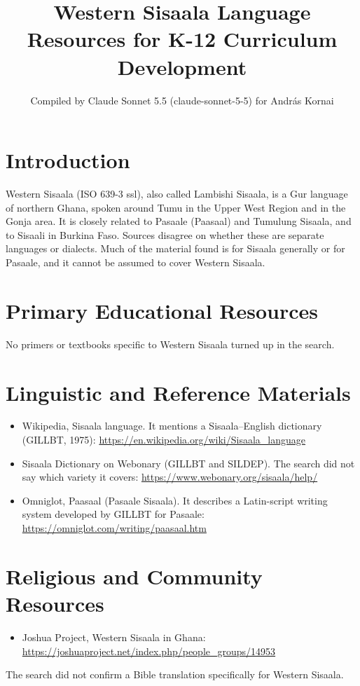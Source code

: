 \documentclass[12pt]{article}
\title{Western Sisaala Language Resources for K-12 Curriculum Development}
\author{Compiled by Claude Sonnet 5.5 (claude-sonnet-5-5) for Andr\'as Kornai}
\date{}
\begin{document}
\maketitle

\section{Introduction}
Western Sisaala (ISO 639-3 ssl), also called Lambishi Sisaala, is a Gur language of northern Ghana, spoken around Tumu in the Upper West Region and in the Gonja area. It is closely related to Pasaale (Paasaal) and Tumulung Sisaala, and to Sisaali in Burkina Faso. Sources disagree on whether these are separate languages or dialects. Much of the material found is for Sisaala generally or for Pasaale, and it cannot be assumed to cover Western Sisaala.

\section{Primary Educational Resources}
No primers or textbooks specific to Western Sisaala turned up in the search.

\section{Linguistic and Reference Materials}
\begin{itemize}
\item Wikipedia, Sisaala language. It mentions a Sisaala--English dictionary (GILLBT, 1975): \url{https://en.wikipedia.org/wiki/Sisaala_language}
\item Sisaala Dictionary on Webonary (GILLBT and SILDEP). The search did not say which variety it covers: \url{https://www.webonary.org/sisaala/help/}
\item Omniglot, Paasaal (Pasaale Sisaala). It describes a Latin-script writing system developed by GILLBT for Pasaale: \url{https://omniglot.com/writing/paasaal.htm}
\end{itemize}

\section{Religious and Community Resources}
\begin{itemize}
\item Joshua Project, Western Sisaala in Ghana: \url{https://joshuaproject.net/index.php/people_groups/14953}
\end{itemize}
The search did not confirm a Bible translation specifically for Western Sisaala.
\end{document}
